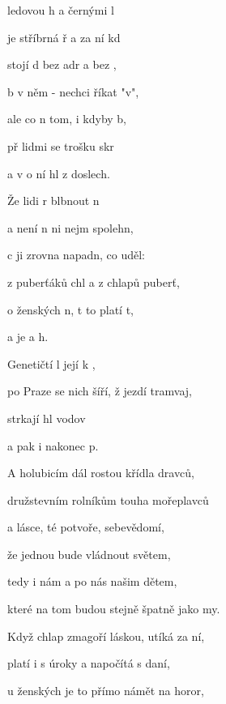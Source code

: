 

\zs
{} ledovou h a černými l

je stříbrná ř a za ní kd

stojí d bez adr a bez ,

b v něm - nechci říkat "v",

ale co n tom, i kdyby b,

př lidmi se trošku skr

a v o ní hl z doslech.
\ks

\zr
Že lidi r blbnout n

a není n ni nejm spolehn,

c ji zrovna napadn, co uděl:  

z puberťáků chl a z chlapů puberť,

o ženských n, t to platí t,

a  je a h.
\kr

\zs
Genetičtí  l její k ,

po Praze se  nich šíří, ž jezdí tramvaj,  

strkají hl  vodov  

a pak i  nakonec p.
\ks

\zr
A holubicím dál rostou křídla dravců,

družstevním rolníkům touha mořeplavců

a lásce, té potvoře, sebevědomí,

že jednou bude vládnout světem,

tedy i nám a po nás našim dětem,

které na tom budou stejně špatně jako my.
\kr

\zr
Když chlap zmagoří láskou, utíká za ní,

platí i s úroky a napočítá s daní,

u ženských je to přímo námět na horor,

